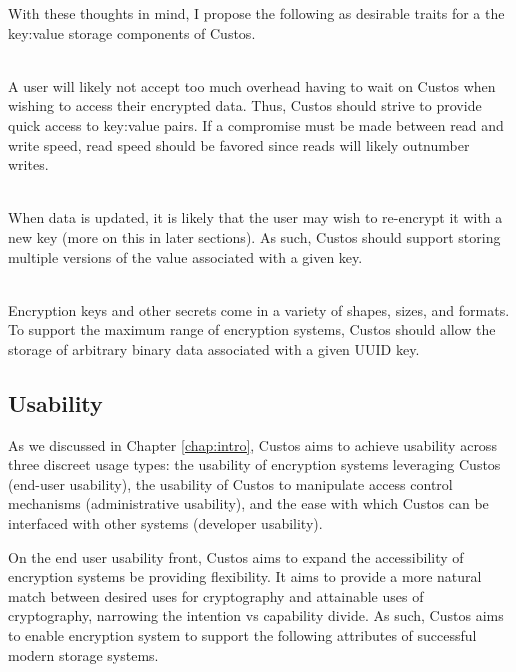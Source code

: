 With these thoughts in mind, I propose the following as desirable
traits for a the key:value storage components of Custos.

\begin{packed_desc}
\item[Fast Access] \hfill \\ A user will likely not accept too much
  overhead having to wait on Custos when wishing to access their
  encrypted data. Thus, Custos should strive to provide quick access
  to key:value pairs. If a compromise must be made between read and
  write speed, read speed should be favored since reads will likely
  outnumber writes.
\item[Versioned Data] \hfill \\ When data is updated, it is likely
  that the user may wish to re-encrypt it with a new key (more on this
  in later sections). As such, Custos should support storing multiple
  versions of the value associated with a given key.
\item[Arbitrary Data] \hfill \\ Encryption keys and other secrets come
  in a variety of shapes, sizes, and formats. To support the maximum
  range of encryption systems, Custos should allow the storage of
  arbitrary binary data associated with a given UUID key.
\end{packed_desc}

\subsection{Usability}

As we discussed in Chapter \ref{chap:intro}, Custos aims to achieve
usability across three discreet usage types: the usability of
encryption systems leveraging Custos (end-user usability), the
usability of Custos to manipulate access control mechanisms
(administrative usability), and the ease with which Custos can be
interfaced with other systems (developer usability).

On the end user usability front, Custos aims to expand the
accessibility of encryption systems be providing flexibility. It aims
to provide a more natural match between desired uses for cryptography
and attainable uses of cryptography, narrowing the intention vs
capability divide. As such, Custos aims to enable encryption system to
support the following attributes of successful modern storage systems.

